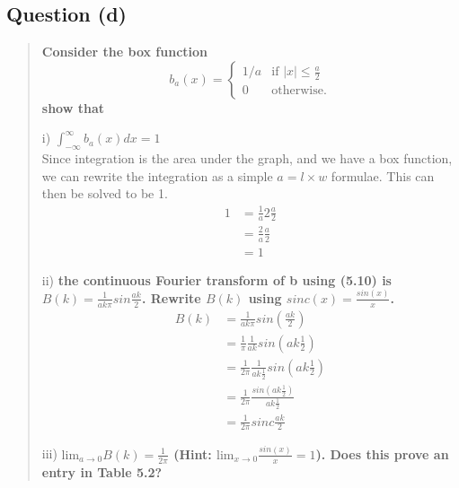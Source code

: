 \subsection{Question (d)}
\begin{quote}
  \textbf{Consider the box function
  \[
    b_a(x) = \begin{cases}
      1/a  & \text{if } |x| \leq \frac{a}{2} \\
      0    & \text{otherwise.}
      \end{cases}
  \]
  show that}
  \begin{itemize*}
  \item[i)] \textbf{$\int_{-\infty}^\infty b_a(x) dx = 1$}\\

    Since integration is the area under the graph, and we have a box function,
    we can rewrite the integration as a simple $a = l \times w$ formulae. This
    can then be solved to be 1.
      \begin{align*}
        1 &= \frac{1}{a}2\frac{a}{2} \\
          &= \frac{2}{a} \frac{a}{2} \\
          &= 1
      \end{align*}

    \item[ii)] \textbf{the continuous Fourier transform of b using (5.10) is
        $B(k) = \frac{1}{ak\pi} sin \frac{ak}{2}$. Rewrite $B(k)$ using $sinc(x)
        = \frac{sin(x)}{x}$.}\\
    \begin{align*}
      B(k) &= \frac{1}{ak\pi}sin\left( \frac{ak}{2}\right) \\
           &= \frac{1}{\pi} \frac{1}{ak} sin \left( ak\frac{1}{2} \right) \\
           &= \frac{1}{2\pi} \frac{1}{ak\frac{1}{2}} sin \left( ak\frac{1}{2} \right) \\
           &= \frac{1}{2\pi} \frac{sin\left( ak\frac{1}{2} \right)}{ak\frac{1}{2}} \\
           &= \frac{1}{2\pi} sinc \frac{ak}{2}
    \end{align*}



    \item[iii)] \textbf{$\text{lim}_{a \rightarrow 0}B(k) = \frac{1}{2\pi}$
        (Hint: $\text{lim}_{x \rightarrow 0}\frac{sin(x)}{x} = 1$). Does this
        prove an entry in Table 5.2?}\\


\end{itemize*}
\end{quote}
